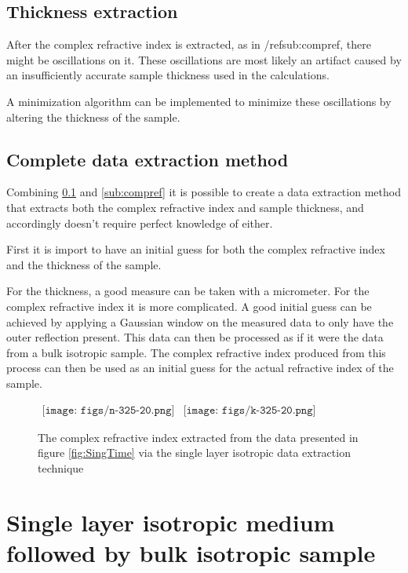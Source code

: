 \subsection{Thickness extraction}
\label{sub: thick}
After the complex refractive index is extracted, as in /ref{sub:compref}, there might be oscillations on it. These oscillations are most likely an artifact caused by an insufficiently accurate sample thickness used in the calculations.

A minimization algorithm can be implemented to minimize these oscillations by altering the thickness of the sample.

\subsection{Complete data extraction method}
\label{sub:datex}
Combining \ref{sub: thick} and \ref{sub:compref} it is possible to create a data extraction method that extracts both the complex refractive index and sample thickness, and accordingly doesn't require perfect knowledge of either.

First it is import to have an initial guess for both the complex refractive index and the thickness of the sample.

For the thickness, a good measure can be taken with a micrometer. For the complex refractive index it is more complicated. A good initial guess can be achieved by applying a Gaussian window on the measured data to only have the outer reflection present. This data can then be processed as if it were the data from a bulk isotropic sample. The complex refractive index produced from this process can then be used as an initial guess for the actual refractive index of the sample.

\begin{figure}[H]
                \begin{center}$
								\begin{array}{cc}
                \texttt{[image: figs/n-325-20.png]}&
                \texttt{[image: figs/k-325-20.png]}
								\end{array}$
								\end{center}
	\caption{The complex refractive index extracted from the data presented in figure \ref{fig:SingTime} via the single layer isotropic data extraction technique}
	\label{fig:SingExt}
\end{figure}

\section{Single layer isotropic medium followed by bulk isotropic sample}
\label{sec:DLM}

